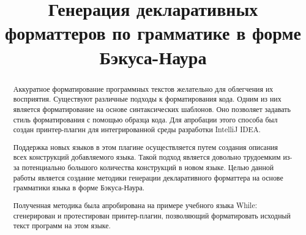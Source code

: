 \documentclass[conference]{IEEEtran}
\begin{document}
%
%
\title{Генерация декларативных форматтеров по грамматике в форме Бэкуса-Наура}


\author{
\and
{}
}

\maketitle

\begin{abstract}


Аккуратное форматирование программных текстов желательно для облегчения их восприятия. 
Существуют различные 
подходы к форматирования кода. 
Одним из них является форматирование на основе синтаксических шаблонов. 
Оно позволяет задавать стиль форматирования с помощью образца кода. %
Для апробации этого способа был создан принтер-плагин\cite{podkopaev:diploma} для интегрированной среды разработки IntelliJ IDEA.

Поддержка новых языков в этом плагине осуществляется путем создания описания всех конструкций добавляемого языка.
Такой подход является довольно трудоемким из-за потенциально большого количества конструкций в новом языке.
Целью данной работы является создание методики генерации декларативного форматтера на основе грамматики языка в форме Бэкуса-Наура.

Полученная методика была апробирована на примере учебного языка While: сгенерирован и протестирован принтер-плагин, позволяющий форматировать исходный текст программ на этом языке. 
\end{abstract}
\end{document}
